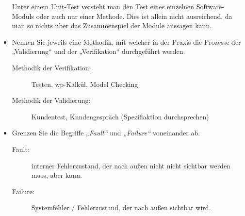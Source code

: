 \documentclass{lehramt-informatik-minimal}
\begin{document}
\begin{itemize}
\begin{antwort}
Unter einem Unit-Test versteht man den Test eines einzelnen
Software-Moduls oder auch nur einer Methode. Dies ist allein nicht
ausreichend, da man so nichts über das Zusammenspiel der Module aussagen
kann.
\end{antwort}

%

\item Nennen Sie jeweils eine Methodik, mit welcher in der Praxis die
Prozesse der „Validierung“ und der „Verifikation“ durchgeführt werden.

\begin{antwort}
\begin{description}
\item[Methodik der Verifikation:]
Testen, wp-Kalkül, Model Checking

\item[Methodik der Validierung:]
Kundentest, Kundengespräch (Spezifiaktion durchsprechen)
\end{description}
\end{antwort}

%

\item Grenzen Sie die Begriffe \emph{„Fault“} und \emph{„Failure“}
voneinander ab.

\begin{antwort}

\begin{description}
\item[Fault:]
interner Fehlerzustand, der nach außen nicht nicht sichtbar werden muss,
aber kann.

\item[Failure:]
Systemfehler / Fehlerzustand, der nach außen sichtbar wird.
\end{description}

\end{antwort}

\end{itemize}
\end{document}
